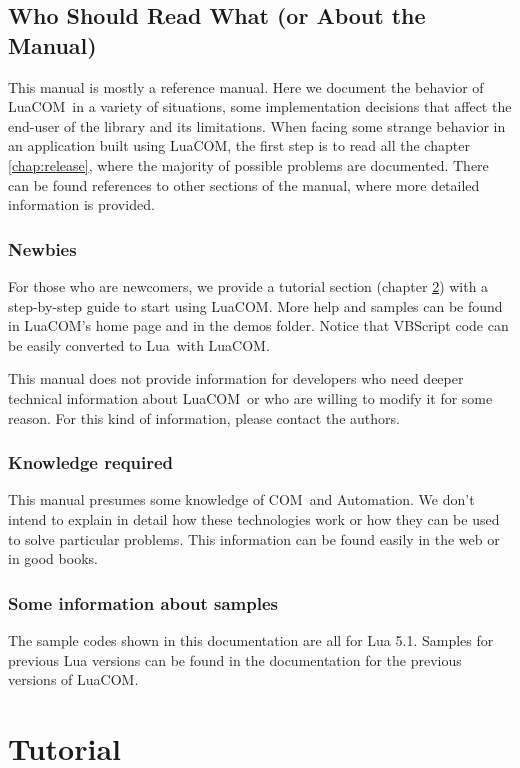 \documentclass[11pt,a4paper,english]{report}
\newcommand{\techname}[1]{\mbox{#1}}
\newcommand{\lua}{\techname{Lua}}
\newcommand{\com}{\techname{COM}}
\newcommand{\luacom}{\techname{LuaCOM}}
\begin{document}
\section{Who Should Read What (or About the Manual)}
This manual is mostly a reference manual. Here we document the
behavior of \luacom\ in a variety of situations, some implementation
decisions that affect the end-user of the library and its
limitations. When facing some strange behavior in an application built
using \luacom, the first step is to read all the chapter
\ref{chap:release}, where the majority of possible problems are
documented. There can be found references to other sections of the
manual, where more detailed information is provided.

\subsection{Newbies} For those who are newcomers, we provide a tutorial
section (chapter \ref{cap:tutorial}) with a step-by-step guide to
start using \luacom. More help and samples can be found in \luacom's
home page and in the demos folder. Notice that VBScript code can be
easily converted to \lua\ with \luacom.

This manual does not provide information for developers who need
deeper technical information about \luacom\ or who are willing to
modify it for some reason. For this kind of information, please
contact the authors.

\subsection{Knowledge required} This manual presumes some knowledge of
\com\ and Automation. We don't intend to explain in detail how these
technologies work or how they can be used to solve particular
problems. This information can be found easily in the web or in good
books.

\subsection{Some information about samples} The sample codes shown in
this documentation are all for Lua 5.1. Samples for previous Lua versions
can be found in the documentation for the previous versions of \luacom.

\chapter{Tutorial}
\label{cap:tutorial}
\end{document}
